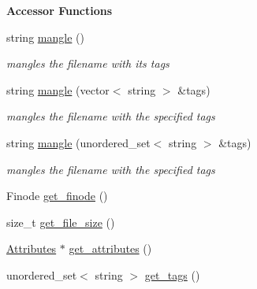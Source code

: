\begin{Indent}\textbf{ Accessor Functions}\par
\begin{DoxyCompactItemize}
\item 
string \mbox{\hyperlink{class_file_info_a96827c2e48fb1a15d468e9afd545383e}{mangle}} ()
\begin{DoxyCompactList}\small\item\em mangles the filename with its tags \end{DoxyCompactList}\item 
string \mbox{\hyperlink{class_file_info_a105ad751f21bead6fc2a76e79cb3b701}{mangle}} (vector$<$ string $>$ \&tags)
\begin{DoxyCompactList}\small\item\em mangles the filename with the specified tags \end{DoxyCompactList}\item 
string \mbox{\hyperlink{class_file_info_aec8a60addbed54097f6cac0a6a516717}{mangle}} (unordered\+\_\+set$<$ string $>$ \&tags)
\begin{DoxyCompactList}\small\item\em mangles the filename with the specified tags \end{DoxyCompactList}\item 
Finode \mbox{\hyperlink{class_file_info_a706117270bcf31739d7ce0aa0d79891f}{get\+\_\+finode}} ()
\item 
size\+\_\+t \mbox{\hyperlink{class_file_info_aa07a5b95bfd41814b7fb2ee30a279c65}{get\+\_\+file\+\_\+size}} ()
\item 
\mbox{\hyperlink{class_attributes}{Attributes}} $\ast$ \mbox{\hyperlink{class_file_info_a07f09582ef3c3beb105906d5c71234a5}{get\+\_\+attributes}} ()
\item 
unordered\+\_\+set$<$ string $>$ \mbox{\hyperlink{class_file_info_a63d01334c1c2ae22e5d1930afa5c74d4}{get\+\_\+tags}} ()
\end{DoxyCompactItemize}
\end{Indent}
